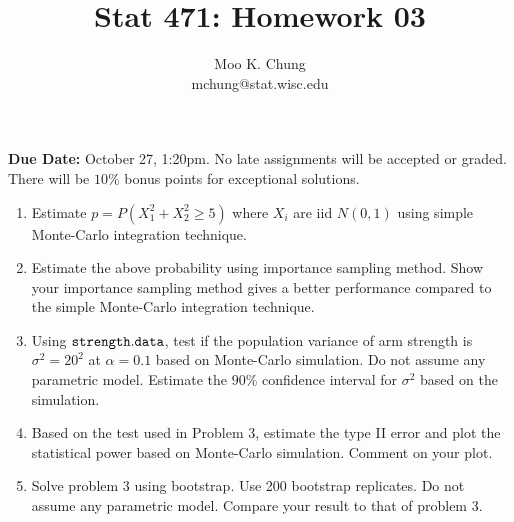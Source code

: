 \documentclass[12pt]{article} %
\begin{document}
\title{Stat 471: Homework 03}
\author{Moo K. Chung\\
mchung@stat.wisc.edu}
\maketitle \thispagestyle{empty}

{\bf Due Date:} October 27, 1:20pm. No late assignments will be
accepted or graded. There will be $10\%$ bonus points for
exceptional solutions.

\begin{enumerate}
\item  Estimate $p=P(X_1^2 + X_2^2 \geq 5)$ where $X_i$ are iid
$N(0,1)$ using simple Monte-Carlo integration technique.

\item Estimate the above probability using importance sampling
method. Show your importance sampling method gives a better
performance compared to the simple Monte-Carlo integration
technique.

\item Using $\tt{strength.data}$, test if the population variance
of arm strength is $\sigma^2=20^2$ at $\alpha = 0.1$ based on
Monte-Carlo simulation. Do not assume any parametric model.
Estimate the $90\%$ confidence interval for $\sigma^2$ based on
the simulation.

\item Based on the test used in Problem 3, estimate the type II
error and plot the statistical power based on Monte-Carlo
simulation. Comment on your plot.

\item Solve problem 3 using bootstrap. Use 200 bootstrap
replicates. Do not assume any parametric model. Compare your
result to that of problem 3.

\end{enumerate}
\end{document}

